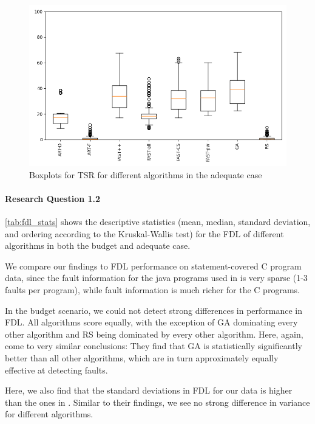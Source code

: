 \begin{figure}[h]
\caption[TSR boxplots, adequate]{Boxplots for TSR for different algorithms in the adequate case}\label{fig:tsr_box}
\centering
\includegraphics[scale=0.7]{figures/tsrs.png}
\end{figure}

\paragraph{Research Question 1.2}

\autoref{tab:fdl_stats} shows the descriptive statistics (mean, median,
standard deviation, and ordering according to the Kruskal-Wallis test)
for the FDL of different algorithms in both the budget and adequate case.

We compare our findings to FDL performance on statement-covered C
program data, since the fault information for the java programs used
in \cite{cruciani2019scalable} is very sparse (1-3 faults per program),
while fault information is much richer for the C programs.

In the budget scenario, we could not detect strong differences in
performance in FDL. All algorithms score equally, with the exception
of GA dominating every other algorithm and RS being dominated by every
other algorithm. Here, again, \cite{cruciani2019scalable} come to very
similar conclusions: They find that GA is statistically significantly
better than all other algorithms, which are in turn approximately equally
effective at detecting faults.

Here, we also find that the standard deviations in FDL for our data
is higher than the ones in \cite{cruciani2019scalable}. Similar to
their findings, we see no strong difference in variance for different
algorithms.

